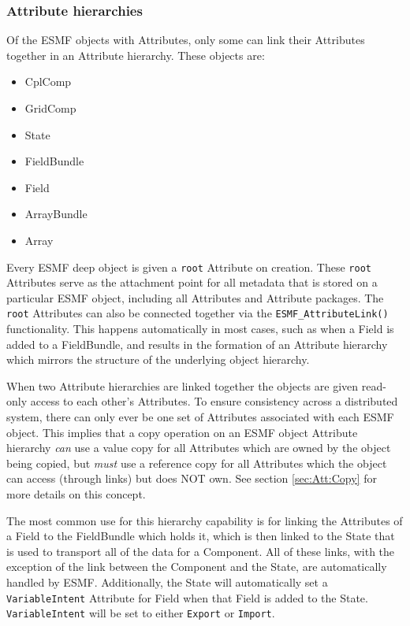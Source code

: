 \subsubsection{Attribute hierarchies}
\label{sec:AttHier}

Of the ESMF objects with Attributes, only some can link their Attributes together in an Attribute hierarchy.  These objects are:

\begin{itemize}
\item CplComp
\item GridComp
\item State
\item FieldBundle
\item Field
\item ArrayBundle
\item Array
\end{itemize}

Every ESMF deep object is given a {\tt root} Attribute on creation.
These {\tt root} Attributes serve as the attachment point for all metadata that 
is stored on a particular ESMF object, including all Attributes and
Attribute packages.  The {\tt root} Attributes can also be connected together via 
the {\tt ESMF\_AttributeLink()} functionality.  This happens automatically in most 
cases, such as when a Field is added to a FieldBundle, and results
in the formation of an Attribute hierarchy which mirrors the structure 
of the underlying object hierarchy.  

When two Attribute hierarchies are linked together 
the objects are given read-only access to each other's Attributes.
To ensure consistency across a distributed system, 
there can only ever be one set of Attributes associated with each ESMF object.  
This implies that a copy operation on an ESMF object Attribute hierarchy {\it can} 
use a value copy for all Attributes which are owned by the object being copied, 
but {\it must} use a reference copy for all Attributes which the object can 
access (through links) but does NOT own. See section \ref{sec:Att:Copy} for more
details on this concept.

The most common use for this hierarchy capability is for linking the Attributes 
of a Field to the FieldBundle which holds it, which is then linked to the 
State that is used to transport all of the data for a Component.  All of 
these links, with the exception of the link between the Component and the 
State, are automatically handled by ESMF. Additionally, the State will 
automatically set a {\tt VariableIntent} Attribute for Field when that Field 
is added to the State.  {\tt VariableIntent} will be set to either 
{\tt Export} or {\tt Import}.

